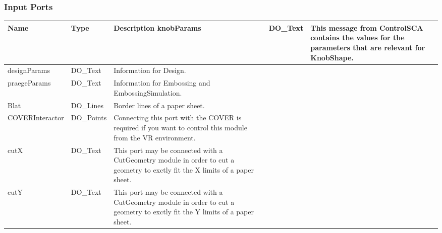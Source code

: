 \begin{htmlonly}
%
\subsubsection{Input Ports}
%


\begin{longtable}{|p{3.5cm}|p{4cm}|p{7cm}|}
\hline
   \bf{Name} & \bf{Type} & \bf{Description} \endhead
\hline\hline
	\textcolor{required}{knobParams} & DO\_Text & 
                 This message from ControlSCA
                 contains the values for the parameters
                 that are relevant for KnobShape.\\
\hline
	\textcolor{required}{designParams} & DO\_Text & 
                    Information for Design.\\
\hline
	\textcolor{required}{praegeParams} & DO\_Text & 
                    Information for Embossing and EmbossingSimulation.\\
\hline
	\textcolor{required}{Blat} & DO\_Lines & 
                    Border lines of a paper sheet.\\
\hline
	\textcolor{required}{COVERInteractor} & DO\_Points & 
                    Connecting this port with the COVER
                    is required if you want to control this
                    module from the VR environment.\\ 
\hline
	\textcolor{required}{cutX} & DO\_Text & 
                    This port may be connected with
                    a CutGeometry module in order to cut
                    a geometry to exctly fit the X limits
                    of a paper sheet.\\
\hline
	\textcolor{required}{cutY} & DO\_Text & 
                    This port may be connected with
                    a CutGeometry module in order to cut
                    a geometry to exctly fit the Y limits
                    of a paper sheet.\\
                     
                    
														

\hline
\end{longtable}



%

\end{htmlonly}
